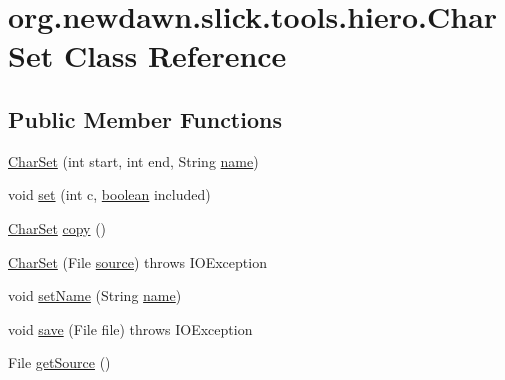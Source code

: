\hypertarget{classorg_1_1newdawn_1_1slick_1_1tools_1_1hiero_1_1_char_set}{}\section{org.\+newdawn.\+slick.\+tools.\+hiero.\+Char\+Set Class Reference}
\label{classorg_1_1newdawn_1_1slick_1_1tools_1_1hiero_1_1_char_set}
\subsection*{Public Member Functions}
\begin{DoxyCompactItemize}
\item 
\mbox{\hyperlink{classorg_1_1newdawn_1_1slick_1_1tools_1_1hiero_1_1_char_set_a304d4e0cdb176116217dfbd0ecc5cff1}{Char\+Set}} (int start, int end, String \mbox{\hyperlink{classorg_1_1newdawn_1_1slick_1_1tools_1_1hiero_1_1_char_set_aff26a369817bc815327582f0b7ac215e}{name}})
\item 
void \mbox{\hyperlink{classorg_1_1newdawn_1_1slick_1_1tools_1_1hiero_1_1_char_set_a9a241ad84da5627b20bd30502a37de02}{set}} (int c, \mbox{\hyperlink{classorg_1_1newdawn_1_1slick_1_1tools_1_1hiero_1_1_char_set_a45913b69f90ce574d65a9023e9d1257c}{boolean}} included)
\item 
\mbox{\hyperlink{classorg_1_1newdawn_1_1slick_1_1tools_1_1hiero_1_1_char_set}{Char\+Set}} \mbox{\hyperlink{classorg_1_1newdawn_1_1slick_1_1tools_1_1hiero_1_1_char_set_ac7b36aa616329685e43d5fe25aca8f38}{copy}} ()
\item 
\mbox{\hyperlink{classorg_1_1newdawn_1_1slick_1_1tools_1_1hiero_1_1_char_set_a9bf7d8e9330c9c26c6ff1a4704cd6f29}{Char\+Set}} (File \mbox{\hyperlink{classorg_1_1newdawn_1_1slick_1_1tools_1_1hiero_1_1_char_set_a82b51d3f0bc57605405fde4608c44520}{source}})  throws I\+O\+Exception 
\item 
void \mbox{\hyperlink{classorg_1_1newdawn_1_1slick_1_1tools_1_1hiero_1_1_char_set_a903427b522ec1db1ff92f00a819236fa}{set\+Name}} (String \mbox{\hyperlink{classorg_1_1newdawn_1_1slick_1_1tools_1_1hiero_1_1_char_set_aff26a369817bc815327582f0b7ac215e}{name}})
\item 
void \mbox{\hyperlink{classorg_1_1newdawn_1_1slick_1_1tools_1_1hiero_1_1_char_set_aae2544c8a0cbe55ef54cfe6b1e21d60e}{save}} (File file)  throws I\+O\+Exception 
\item 
File \mbox{\hyperlink{classorg_1_1newdawn_1_1slick_1_1tools_1_1hiero_1_1_char_set_a7e09cb1cd14964453372d8995cfae807}{get\+Source}} ()

\end{DoxyCompactItemize}
